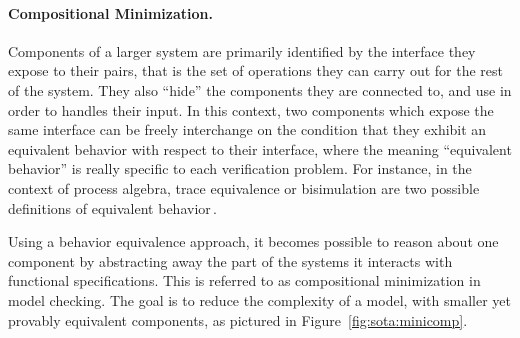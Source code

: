 \paragraph{Compositional Minimization.}
%
Components of a larger system are primarily identified by the interface they
expose to their pairs, that is the set of operations they can carry out for the
rest of the system.
%
They also ``hide'' the components they are connected to, and use in order to
handles their input.
%
In this context, two components which expose the same interface can be freely
interchange on the condition that they exhibit an equivalent behavior with
respect to their interface, where the meaning ``equivalent behavior'' is really
specific to each verification problem.
%
For instance, in the context of process algebra, trace equivalence or
bisimulation are two possible definitions of equivalent
behavior\,\cite{fokkink2013pa}.

Using a behavior equivalence approach, it becomes possible to reason about one
component by abstracting away the part of the systems it interacts with
functional specifications.
%
This is referred to as compositional minimization in model checking.
%
The goal is to reduce the complexity of a model, with smaller yet provably
equivalent components, as pictured in Figure~\ref{fig:sota:minicomp}.
%


